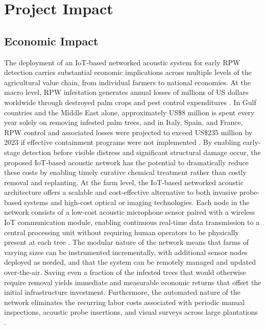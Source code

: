 \documentclass[12pt,a4paper,oneside]{memoir}
\begin{document}
\section{Project Impact}
\label{sec:Impact}
 
\subsection{Economic Impact}
 
The deployment of an IoT-based networked acoustic system for early RPW detection carries substantial economic implications across multiple levels of the agricultural value chain, from individual farmers to national economies. At the macro level, RPW infestation generates annual losses of millions of US dollars worldwide through destroyed palm crops and pest control expenditures \cite{ashry2020,saleem2022}. In Gulf countries and the Middle East alone, approximately US\$8 million is spent every year solely on removing infested palm trees, and in Italy, Spain, and France, RPW control and associated losses were projected to exceed US\$235 million by 2023 if effective containment programs were not implemented \cite{ashry2020}. By enabling early-stage detection before visible distress and significant structural damage occur, the proposed IoT-based acoustic network has the potential to dramatically reduce these costs by enabling timely curative chemical treatment rather than costly removal and replanting. At the farm level, the IoT-based networked acoustic architecture offers a scalable and cost-effective alternative to both invasive probe-based systems and high-cost optical or imaging technologies. Each node in the network consists of a low-cost acoustic microphone sensor paired with a wireless IoT communication module, enabling continuous real-time data transmission to a central processing unit without requiring human operators to be physically present at each tree \cite{karar2021}. The modular nature of the network means that farms of varying sizes can be instrumented incrementally, with additional sensor nodes deployed as needed, and that the system can be remotely managed and updated over-the-air. Saving even a fraction of the infested trees that would otherwise require removal yields immediate and measurable economic returns that offset the initial infrastructure investment. Furthermore, the automated nature of the network eliminates the recurring labor costs associated with periodic manual inspections, acoustic probe insertions, and visual surveys across large plantations \cite{saleem2022}.
 
\end{document}
